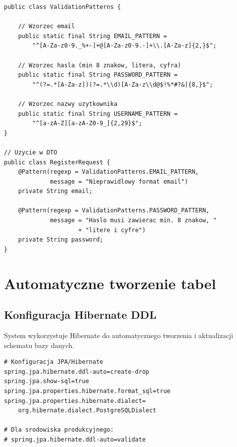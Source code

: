 \documentclass[12pt,a4paper]{report}
\begin{document}
\begin{lstlisting}[style=javastyle, caption={Wzorce walidacji}]
public class ValidationPatterns {
    
    // Wzorzec email
    public static final String EMAIL_PATTERN = 
        "^[A-Za-z0-9._%+-]+@[A-Za-z0-9.-]+\\.[A-Za-z]{2,}$";
    
    // Wzorzec hasla (min 8 znakow, litera, cyfra)
    public static final String PASSWORD_PATTERN = 
        "^(?=.*[A-Za-z])(?=.*\\d)[A-Za-z\\d@$!%*#?&]{8,}$";
    
    // Wzorzec nazwy uzytkownika
    public static final String USERNAME_PATTERN = 
        "^[a-zA-Z][a-zA-Z0-9_]{2,29}$";
}

// Uzycie w DTO
public class RegisterRequest {
    @Pattern(regexp = ValidationPatterns.EMAIL_PATTERN,
             message = "Nieprawidlowy format email")
    private String email;
    
    @Pattern(regexp = ValidationPatterns.PASSWORD_PATTERN,
             message = "Haslo musi zawierac min. 8 znakow, "
                     + "litere i cyfre")
    private String password;
}
\end{lstlisting}

\chapter{Automatyczne tworzenie tabel}

\section{Konfiguracja Hibernate DDL}

System wykorzystuje Hibernate do automatycznego tworzenia i aktualizacji schematu bazy danych.

\begin{lstlisting}[style=propstyle, caption={application.properties - konfiguracja DDL}]
# Konfiguracja JPA/Hibernate
spring.jpa.hibernate.ddl-auto=create-drop
spring.jpa.show-sql=true
spring.jpa.properties.hibernate.format_sql=true
spring.jpa.properties.hibernate.dialect=
    org.hibernate.dialect.PostgreSQLDialect

# Dla srodowiska produkcyjnego:
# spring.jpa.hibernate.ddl-auto=validate
\end{lstlisting}
\end{document}
